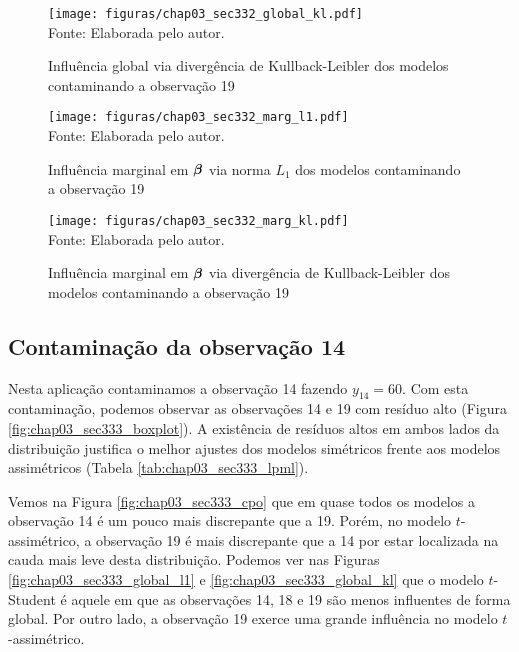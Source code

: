 \begin{figure}[H]
\begin{center}
\caption{Influência global via divergência de Kullback-Leibler dos modelos contaminando a observação 19}
\label{fig:chap03_sec332_global_kl}
\texttt{[image: figuras/chap03\_sec332\_global\_kl.pdf]}
\\ Fonte: Elaborada pelo autor.
\end{center}
\end{figure}

\begin{figure}[H]
\begin{center}
\caption{Influência marginal em ${\boldsymbol{\beta}}$ via norma $L_1$ dos modelos contaminando a observação 19}
\label{fig:chap03_sec332_marg_l1}
\texttt{[image: figuras/chap03\_sec332\_marg\_l1.pdf]}
\\ Fonte: Elaborada pelo autor.
\end{center}
\end{figure}

\begin{figure}[H]
\begin{center}
\caption{Influência marginal em ${\boldsymbol{\beta}}$ via divergência de Kullback-Leibler dos modelos contaminando a observação 19}
\label{fig:chap03_sec332_marg_kl}
\texttt{[image: figuras/chap03\_sec332\_marg\_kl.pdf]}
\\ Fonte: Elaborada pelo autor.
\end{center}
\end{figure}

\subsection{Contaminação da observação 14}

Nesta aplicação contaminamos a observação 14 fazendo $y_{14} = 60$. Com esta contaminação, podemos observar as observações 14 e 19 com resíduo alto (Figura \ref{fig:chap03_sec333_boxplot}). A existência de resíduos altos em ambos lados da distribuição justifica o melhor ajustes dos modelos simétricos frente aos modelos assimétricos (Tabela \ref{tab:chap03_sec333_lpml}).

Vemos na Figura \ref{fig:chap03_sec333_cpo} que em quase todos os modelos a observação 14 é um pouco mais discrepante que a 19. Porém, no modelo $t$-assimétrico, a observação 19 é mais discrepante que a 14 por estar localizada na cauda mais leve desta distribuição. Podemos ver nas Figuras \ref{fig:chap03_sec333_global_l1} e \ref{fig:chap03_sec333_global_kl} que o modelo $t$-Student é aquele em que as observações 14, 18 e 19 são menos influentes de forma global. Por outro lado, a observação 19 exerce uma grande influência no modelo $t$-assimétrico.

